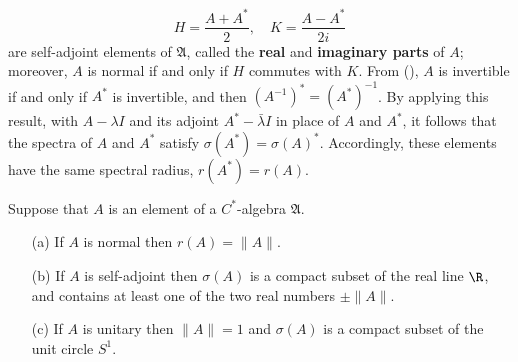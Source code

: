 \[H=\frac{A+A^*}{2},\quad K=\frac{A-A^*}{2i}\]
are self-adjoint elements of $\mathfrak{A}$, called the \textbf{real} and \textbf{imaginary parts} of $A$; moreover, $A$ is normal if and only if $H$ commutes with $K$. From (), $A$ is invertible if and only if $A^*$ is invertible, and then $(A^{-1})^*=(A^*)^{-1}$. By applying this result, with $A-\lambda I$ and its adjoint $A^*-\bar{\lambda}I$ in place of $A$ and $A^*$, it follows that the spectra of $A$ and $A^*$ satisfy $\sigma(A^*)=\sigma(A)^*$. Accordingly, these elements have the same spectral radius, $r(A^*)=r(A)$.
\begin{proposition}\label{C^* algebra spectrum prop}
Suppose that $A$ is an element of a $C^*$-algebra $\mathfrak{A}$.
\begin{itemize}
\item[(a)] If $A$ is normal then $r(A)=\|A\|$.
\item[(b)] If $A$ is self-adjoint then $\sigma(A)$ is a compact subset of the real line $\R$, and contains at least one of the two real numbers $\pm\|A\|$.
\item[(c)] If $A$ is unitary then $\|A\|=1$ and $\sigma(A)$ is a compact subset of the unit circle $S^1$.
\end{itemize}
\end{proposition}

